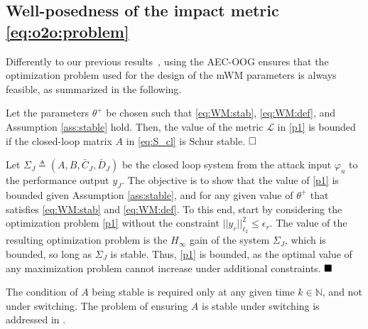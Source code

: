 \subsection{Well-posedness of the impact metric \eqref{eq:o2o:problem}}
Differently to our previous results~\citep{gallo2021design}, using the AEC-OOG ensures that the optimization problem used for the design of the mWM parameters is always feasible, as summarized in the following.


\begin{theorem}\label{thm:well:posed}
Let the parameters $\theta^{+}$ be chosen such that \eqref{eq:WM:stab}, \eqref{eq:WM:def}, and Assumption \ref{ass:stable} hold. 
Then, the value of the metric $\mathcal{L}$ in \eqref{p1} is bounded if the closed-loop matrix $A$ in \eqref{eq:S_cl} is Schur stable. 
$\hfill \square$
\end{theorem}

\begin{pf} 
Let $\Sigma_J \triangleq (A,B,\bar{C}_J,\bar{D}_J)$ be the closed loop system from the attack input $\varphi_u$ to the performance output $y_J$. The objective is to show that the value of \eqref{p1} is bounded given Assumption \ref{ass:stable}, and for any given value of $\theta^+$ that satisfies \eqref{eq:WM:stab} and \eqref{eq:WM:def}. To this end, start by considering the optimization problem \eqref{p1} without the constraint $||y_r||_{\ell_2}^2 \leq \epsilon_r$. %
The value of the resulting optimization problem is the $H_{\infty}$ gain of the system $\Sigma_J$, which is bounded, so long as $\Sigma_J$ is stable. Thus, \eqref{p1} is bounded, as the optimal value of any maximization problem cannot increase under additional constraints.
$\hfill\blacksquare$
\end{pf}
The condition of $A$ being stable is required only at any given time $k \in \mathbb N$, and not under switching. The problem of ensuring $A$ is stable under switching is addressed in \cite[Thm. 3]{ferrari2020switching}.

